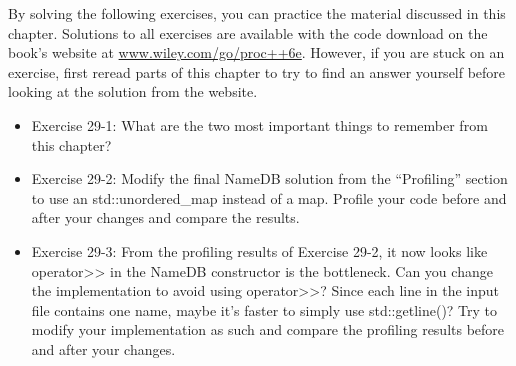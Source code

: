 By solving the following exercises, you can practice the material discussed in this chapter. Solutions to all exercises are available with the code download on the book’s website at \url{www.wiley.com/go/proc++6e}. However, if you are stuck on an exercise, first reread parts of this chapter to try to find an answer yourself before looking at the solution from the website.

\begin{itemize}
\item
Exercise 29-1: What are the two most important things to remember from this chapter?

\item
Exercise 29-2: Modify the final NameDB solution from the “Profiling” section to use an std::unordered\_map instead of a map. Profile your code before and after your changes and compare the results.

\item
Exercise 29-3: From the profiling results of Exercise 29-2, it now looks like operator>{}> in the NameDB constructor is the bottleneck. Can you change the implementation to avoid using operator>{}>? Since each line in the input file contains one name, maybe it’s faster to simply use std::getline()? Try to modify your implementation as such and compare the profiling results before and after your changes.
\end{itemize}






